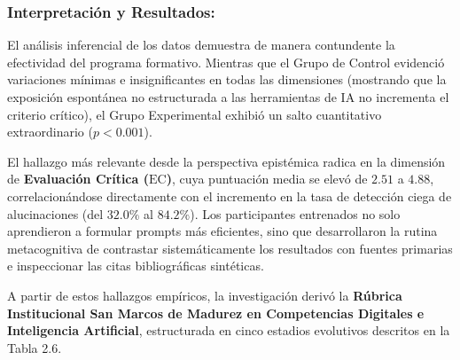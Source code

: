 \newpage

\subsubsection*{Interpretación y Resultados:}
El análisis inferencial de los datos demuestra de manera contundente la efectividad del programa formativo. Mientras que el Grupo de Control evidenció variaciones mínimas e insignificantes en todas las dimensiones (mostrando que la exposición espontánea no estructurada a las herramientas de IA no incrementa el criterio crítico), el Grupo Experimental exhibió un salto cuantitativo extraordinario ($p < 0.001$).

El hallazgo más relevante desde la perspectiva epistémica radica en la dimensión de \textbf{Evaluación Crítica ($\text{EC}$)}, cuya puntuación media se elevó de $2.51$ a $4.88$, correlacionándose directamente con el incremento en la tasa de detección ciega de alucinaciones (del $32.0\%$ al $84.2\%$). Los participantes entrenados no solo aprendieron a formular prompts más eficientes, sino que desarrollaron la rutina metacognitiva de contrastar sistemáticamente los resultados con fuentes primarias e inspeccionar las citas bibliográficas sintéticas.

A partir de estos hallazgos empíricos, la investigación derivó la \textbf{Rúbrica Institucional San Marcos de Madurez en Competencias Digitales e Inteligencia Artificial}, estructurada en cinco estadios evolutivos descritos en la Tabla 2.6.

